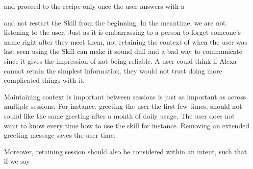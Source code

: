 

\begin{flushright}
\end{flushright}

\noindent and proceed to the recipe only once the user answers with a 





\noindent and not restart the Skill from the beginning. In the meantime, we are not listening to the user. Just as it is embarrassing to a person to forget someone's name right after they meet them, not retaining the context of when the user was last seen using the Skill can make it sound dull and a bad way to communicate since it gives the impression of not being reliable. A user could think if Alexa cannot retain the simplest information, they would not trust doing more complicated things with it.

Maintaining context is important between sessions is just as important as across multiple sessions. For instance, greeting the user the first few times, should not sound like the same greeting after a month of daily usage. The user does not want to know every time how to use the skill for instance. Removing an extended greeting message saves the user time.

Moreover, retaining session should also be considered within an intent, such that if we say


